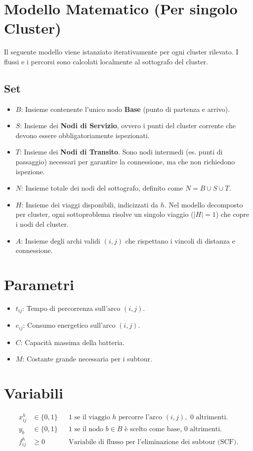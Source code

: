 \documentclass{article}
\begin{document}
\section{Modello Matematico (Per singolo Cluster)}
Il seguente modello viene istanziato iterativamente per ogni cluster rilevato. I flussi e i percorsi sono calcolati localmente al sottografo del cluster.

\subsection{Set}
\begin{itemize}
    \item $B$: Insieme contenente l'unico nodo \textbf{Base} (punto di partenza e arrivo).
    \item $S$: Insieme dei \textbf{Nodi di Servizio}, ovvero i punti del cluster corrente che devono essere obbligatoriamente ispezionati.
    \item $T$: Insieme dei \textbf{Nodi di Transito}. Sono nodi intermedi (es. punti di passaggio) necessari per garantire la connessione, ma che non richiedono ispezione.
    \item $N$: Insieme totale dei nodi del sottografo, definito come $N = B \cup S \cup T$.
    \item $H$: Insieme dei viaggi disponibili, indicizzati da $h$. 
    Nel modello decomposto per cluster, ogni sottoproblema risolve un singolo viaggio ($|H|=1$) che copre i nodi del cluster.
    \item $A$: Insieme degli archi validi $(i,j)$ che rispettano i vincoli di distanza e connessione.
\end{itemize}
\section{Parametri}
\begin{itemize}
    \item $t_{ij}$: Tempo di percorrenza sull'arco $(i,j)$.
    \item $e_{ij}$: Consumo energetico sull'arco $(i,j)$.
    \item $C$: Capacità massima della batteria.
    \item $M$: Costante grande necessaria per i subtour.
\end{itemize}
\section{Variabili}
\begin{align*}
    x_{ij}^h & \in \{0, 1\} && \text{1 se il viaggio } h \text{ percorre l'arco } (i,j), \text{ 0 altrimenti.}\\
    y_b & \in \{0, 1\} && \text{1 se il nodo } b \in B \text{ è scelto come base, 0 altrimenti.} \\
    f_{ij}^h & \ge 0 && \text{Variabile di flusso per l'eliminazione dei subtour (SCF).}
\end{align*}
\end{document}
